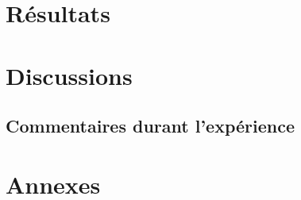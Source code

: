 \documentclass[a4paper,12pt]{article}
\newcommand{\PATH}[2]{"C:/Users/Florian/OneDrive - Universite de Montreal/LaTeX/BioTex/BioTex/#1/#2"}
\begin{document}








\section{Résultats}

\section{Discussions}

\subsection{Commentaires durant l'expérience}


\newpage
\section{Annexes}


\printnomenclature
\end{document}
